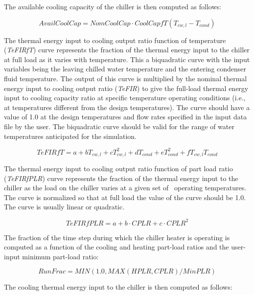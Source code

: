 The available cooling capacity of the chiller is then computed as follows:

\begin{equation}
AvailCoolCap = NomCoolCap \cdot CoolCapfT({T_{cw,l}} - {T_{cond}})
\end{equation}

The thermal energy input to cooling output ratio function of temperature (\emph{TeFIRfT}) curve represents the fraction of the thermal energy input to the chiller at full load as it varies with temperature. This a biquadratic curve with the input variables being the leaving chilled water temperature and the entering condenser fluid temperature. The output of this curve is multiplied by the nominal thermal energy input to cooling output ratio (\emph{TeFIR}) to give the full-load thermal energy input to cooling capacity ratio at specific temperature operating conditions (i.e., at temperatures different from the design temperatures). The curve should have a value of 1.0 at the design temperatures and flow rates specified in the input data file by the user. The biquadratic curve should be valid for the range of water temperatures anticipated for the simulation.

\begin{equation}
TeFIRfT = a + b{T_{cw,l}} + cT_{cw,l}^2 + d{T_{cond}} + eT_{cond}^2 + f{T_{cw,l}}{T_{cond}}
\end{equation}

The thermal energy input to cooling output ratio function of part load ratio (\emph{TeFIRfPLR}) curve represents the fraction of the thermal energy input to the chiller as the load on the chiller varies at a given set of~ operating temperatures. The curve is normalized so that at full load the value of the curve should be 1.0. The curve is usually linear or quadratic.

\begin{equation}
TeFIRfPLR = a + b \cdot CPLR + c \cdot CPL{R^2}
\end{equation}

The fraction of the time step during which the chiller heater is operating is computed as a function of the cooling and heating part-load ratios and the user-input minimum part-load ratio:

\begin{equation}
RunFrac = MIN(1.0,MAX\left( {HPLR,CPLR} \right)/MinPLR)
\end{equation}

The cooling thermal energy input to the chiller is then computed as follows:

